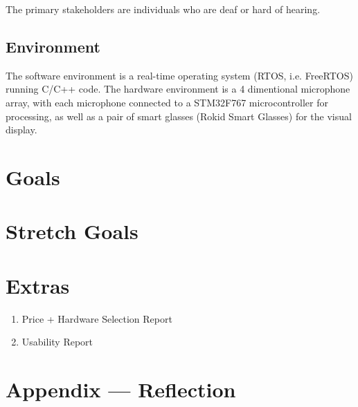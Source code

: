\documentclass{article}
\begin{document}
The primary stakeholders are individuals who are deaf or hard of hearing.

\subsection{Environment}

The software environment is a real-time operating system (RTOS, i.e. FreeRTOS) running C/C++ code.
The hardware environment is a 4 dimentional microphone array, with each microphone connected to a STM32F767 microcontroller for processing, as well as a pair of smart glasses (Rokid Smart Glasses) for the visual display.

\section{Goals}

\section{Stretch Goals}

\section{Extras}

\begin{enumerate}
    \item Price + Hardware Selection Report
    \item Usability Report
\end{enumerate} 

\newpage{}

\section*{Appendix --- Reflection}


\end{document}
